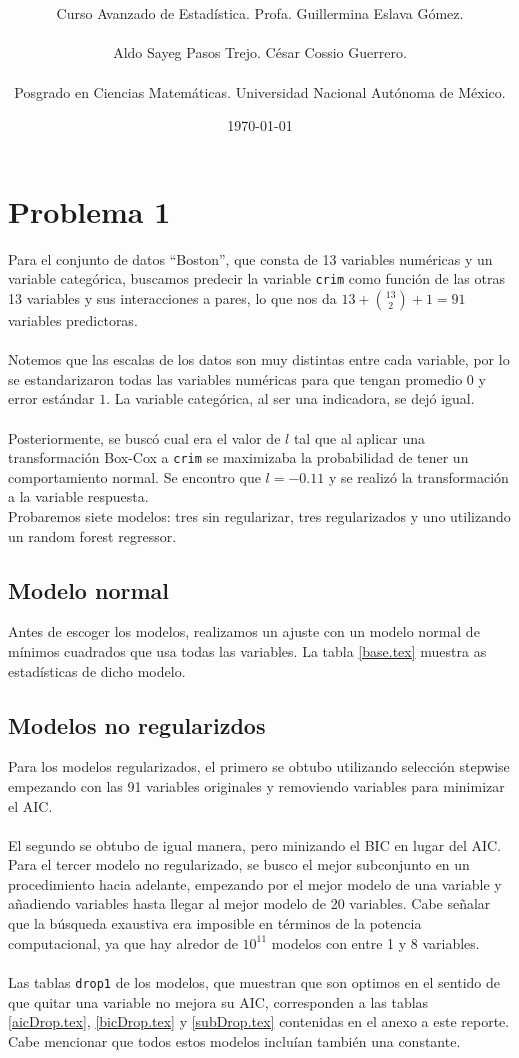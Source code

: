 \documentclass[11pt]{article}
\title{\textbf{\work}}
\author{Curso Avanzado de Estadística. Profa. Guillermina Eslava Gómez.\\ \\ Aldo Sayeg Pasos Trejo. César Cossio Guerrero. \\ \\ Posgrado en Ciencias Matemáticas. Universidad Nacional Autónoma de México. }
\date{\today}
\newcommand{\tablasimple}[2]{\begin{table}[H] \centering  \caption{#2} \label{#1} \end{table}}
\begin{document}
\maketitle
\section{Problema 1}
Para el conjunto de datos ``Boston'', que consta de 13 variables numéricas y un variable categórica, buscamos predecir la variable \texttt{crim} como función de las otras 13 variables y sus interacciones a pares, lo que nos da $13 + \binom{13}{2} + 1 = 91$ variables predictoras.
\\
\\Notemos que las escalas de los datos son muy distintas entre cada variable, por lo se estandarizaron todas las variables numéricas para que tengan promedio $0$ y error estándar $1$. La variable categórica, al ser una indicadora, se dejó igual. 
\\
\\Posteriormente, se buscó cual era el valor de $l$ tal que al aplicar una transformación Box-Cox a \texttt{crim} se maximizaba la probabilidad de tener un comportamiento normal. Se encontro que $l = -0.11$ y se realizó la transformación a la variable respuesta.
\\
Probaremos siete modelos: tres sin regularizar, tres regularizados y uno utilizando un random forest regressor.
\subsection{Modelo normal}
Antes de escoger los modelos, realizamos un ajuste con un modelo normal de mínimos cuadrados que usa todas las variables. La tabla \ref{base.tex} muestra as estadísticas de dicho modelo.
\tablasimple{base.tex}{Estadísticas del modelo base. Los errores no aparentes se calcularon mediante validación cruzada con $k=5$ y $100$ repeticiones}
\subsection{Modelos no regularizdos}
Para los modelos regularizados, el primero se obtubo utilizando selección stepwise empezando con las 91 variables originales y removiendo variables para minimizar el AIC.
\\
\\El segundo se obtubo de igual manera, pero minizando el BIC en lugar del AIC. Para el tercer modelo no regularizado, se busco el mejor subconjunto en un procedimiento hacia adelante, empezando por el mejor modelo de una variable y añadiendo variables hasta llegar al mejor modelo de 20 variables. Cabe señalar que la búsqueda exaustiva era imposible en términos de la potencia computacional, ya que hay alredor de $10^{11}$ modelos con entre 1 y 8 variables.
\\
\\Las tablas \texttt{drop1} de los modelos, que muestran que son optimos en el sentido de que quitar una variable no mejora su AIC, corresponden a las tablas  \ref{aicDrop.tex}, \ref{bicDrop.tex} y \ref{subDrop.tex} contenidas en el anexo a este reporte. Cabe mencionar que todos estos modelos incluían también una constante. 
\end{document}
